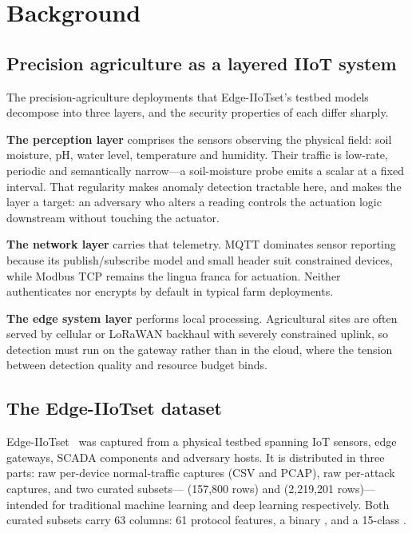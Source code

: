 \section{Background}

\subsection{Precision agriculture as a layered IIoT system}

The precision-agriculture deployments that Edge-IIoTset's testbed models
decompose into three layers, and the security properties of each differ
sharply.

\textbf{The perception layer} comprises the sensors observing the physical
field: soil moisture, pH, water level, temperature and humidity. Their traffic
is low-rate, periodic and semantically narrow---a soil-moisture probe emits a
scalar at a fixed interval. That regularity makes anomaly detection tractable
here, and makes the layer a target: an adversary who alters a reading controls
the actuation logic downstream without touching the actuator.

\textbf{The network layer} carries that telemetry. MQTT dominates sensor
reporting because its publish/subscribe model and small header suit constrained
devices, while Modbus TCP remains the lingua franca for actuation. Neither
authenticates nor encrypts by default in typical farm deployments.

\textbf{The edge system layer} performs local processing. Agricultural sites
are often served by cellular or LoRaWAN backhaul with severely constrained
uplink, so detection must run on the gateway rather than in the cloud, where
the tension between detection quality and resource budget binds.

\subsection{The Edge-IIoTset dataset}

Edge-IIoTset~\cite{ferrag2022edgeiiotset} was captured from a physical testbed
spanning IoT sensors, edge gateways, SCADA components and adversary hosts. It
is distributed in three parts: raw per-device normal-traffic captures (CSV and
PCAP), raw per-attack captures, and two curated subsets---
 (157{,}800 rows) and
 (2{,}219{,}201 rows)---intended for traditional
machine learning and deep learning respectively. Both curated subsets carry 63
columns: 61 protocol features, a binary , and a 15-class
.


